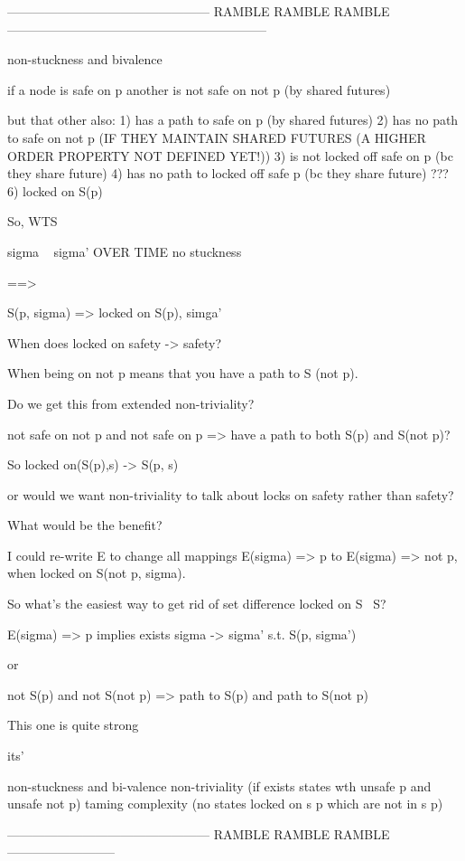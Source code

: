 \documentclass{article}
\theoremstyle{definition}
\begin{document}
------------------------------------------------ RAMBLE RAMBLE RAMBLE --------------------------------------------------------------


non-stuckness and bivalence

if a node is safe on p
another is not safe on not p (by shared futures)

but that other also:
1) has a path to safe on p (by shared futures)
2) has no path to safe on not p (IF THEY MAINTAIN SHARED FUTURES (A HIGHER ORDER PROPERTY NOT DEFINED YET!))
3) is not locked off safe on p (bc they share future)
4) has no path to locked off safe p (bc they share future)
???
6) locked on S(p)





So, WTS 

sigma ~ sigma' OVER TIME
no stuckness

==>

S(p, sigma) => locked on S(p), simga'

When does locked on safety -> safety? 

When being on not p means that you have a path to S (not p).

Do we get this from extended non-triviality?

not safe on not p and not safe on p => have a path to both S(p) and S(not p)?

So locked on(S(p),s) -> S(p, s)

or would we want non-triviality to talk about locks on safety rather than safety?

What would be the benefit?

I could re-write E to change all mappings E(sigma) => p to E(sigma) => not p, when locked on S(not p, sigma).

So what's the easiest way to get rid of set difference locked on S \ S?

E(sigma) => p implies exists sigma -> sigma' s.t. S(p, sigma')

or

not S(p) and not S(not p) => path to S(p) and path to S(not p)

This one is quite strong 

its' 

non-stuckness and bi-valence
non-triviality (if exists states wth unsafe p and unsafe not p)
taming complexity (no states locked on s p which are not in s p)

------------------------------------------------ RAMBLE RAMBLE RAMBLE --------------------------
\end{document}

